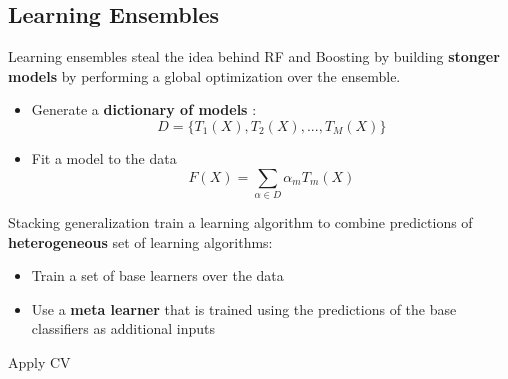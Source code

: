 \subsection{Learning Ensembles}
Learning ensembles steal the idea behind RF and Boosting by building \textbf{stonger models} by performing a global optimization over the ensemble.
\begin{itemize}
\item Generate a \textbf{dictionary of models} :
$$ D = \{ T_1(X) ,T_2(X) ,...,T_M(X) \}$$
\item Fit a model to the data
$$ F(X) = \sum \limits_{\alpha \in D} \alpha_mT_m(X)$$
\end{itemize}
Stacking generalization  train a learning algorithm to combine predictions of \textbf{heterogeneous} set of learning algorithms:
\begin{itemize}
\item Train a set of base learners over the data 
\item Use a \textbf{meta learner} that is trained using the predictions of the base classifiers as additional inputs
\end{itemize}
Apply CV